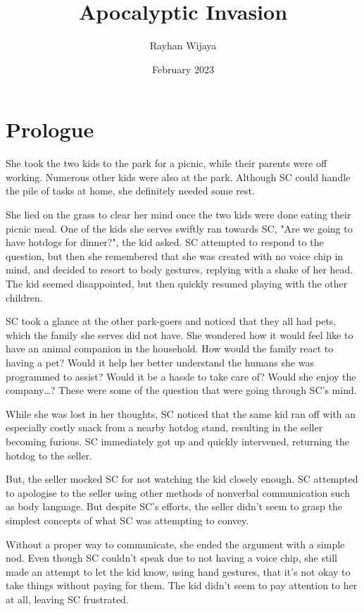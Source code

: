\documentclass[12pt]{book}
\title{Apocalyptic Invasion}
\author{Rayhan Wijaya}
\date{February 2023}
\begin{document}
\maketitle

\section*{Prologue}

She took the two kids to the park for a picnic, while
their parents were off working. Numerous other kids were
also at the park. Although SC could handle the pile of
tasks at home, she definitely needed some rest.

She lied on the grass to clear her mind once the two kids
were done eating their picnic meal. One of the kids she
serves swiftly ran towards SC, "Are we going to have
hotdogs for dinner?", the kid asked. SC attempted to
respond to the question, but then she remembered that she
was created with no voice chip in mind, and decided to
resort to body gestures, replying with a shake of her
head. The kid seemed disappointed, but then quickly
resumed playing with the other children.

SC took a glance at the other park-goers and noticed that
they all had pets, which the family she serves did not
have. She wondered how it would feel like to have an
animal companion in the household. How would the family
react to having a pet? Would it help her better
understand the humans she was programmed to assist? Would
it be a hassle to take care of? Would she enjoy the
company…? These were some of the question that were going
through SC’s mind.

While she was lost in her thoughts, SC noticed that the
same kid ran off with an especially costly snack from a
nearby hotdog stand, resulting in the seller becoming
furious. SC immediately got up and quickly intervened,
returning the hotdog to the seller.

But, the seller mocked SC for not watching the kid
closely enough. SC attempted to apologise to the seller
using other methods of nonverbal communication such as
body language. But despite SC's efforts, the seller
didn't seem to grasp the simplest concepts of what SC was
attempting to convey.

Without a proper way to communicate, she ended the
argument with a simple nod. Even though SC couldn’t speak
due to not having a voice chip, she still made an attempt
to let the kid know, using hand gestures, that it’s not
okay to take things without paying for them. The kid
didn’t seem to pay attention to her at all, leaving SC
frustrated.
\end{document}
